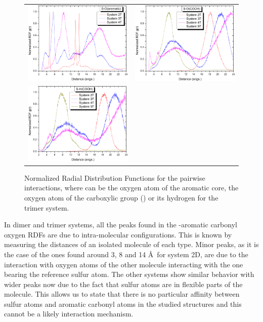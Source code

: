 \begin{figure}[htb]
	\begin{tabular}{cc}
		\includegraphics[width=0.45\columnwidth]{image/rdf_SOar2} &
		\includegraphics[width=0.45\columnwidth]{image/rdf_SOcarb2} \\
		\includegraphics[width=0.45\columnwidth]{image/rdf_SHcarb2} & \\        
	\end{tabular}
	\caption{Normalized Radial Distribution Functions for the  pairwise interactions, where  can be the oxygen atom of the aromatic core, the oxygen atom of the carboxylic group () or its hydrogen for the trimer system.}
	\label{pap:fig17}
\end{figure}	

In dimer and trimer systems, all the peaks found in the -aromatic carbonyl oxygen RDFs are due to intra-molecular configurations. This is known by measuring the  distances of an isolated molecule of each type. Minor peaks, as it is the case of the ones found around 3, 8 and 14 \AA~for system 2D, are due to the interaction with oxygen atoms of the other molecule interacting with the one bearing the reference sulfur atom. The other systems show similar behavior with wider peaks now due to the fact that sulfur atoms are in flexible parts of the molecule. This allows us to state that there is no particular affinity between sulfur atoms and aromatic carbonyl atoms in the studied structures and this cannot be a likely interaction mechanism.\\

